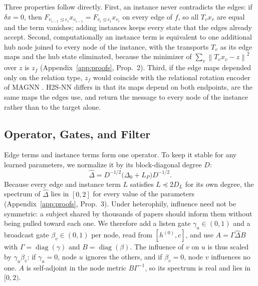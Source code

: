 \documentclass{article}
\newcommand{\method}{\textsc{H2S-NN}}
\newcommand{\norm}[1]{\left\lVert #1\right\rVert}
\newcommand{\inc}{\trianglelefteq}
\begin{document}
Three properties follow directly. First, an instance never contradicts the edges: if $\delta x=0$, then $F_{v_{i-1}\inc e_i}x_{v_{i-1}}=F_{v_i\inc e_i}x_{v_i}$ on every edge of $f$, so all $T_vx_v$ are equal and the term vanishes; adding instances keeps every state that the edges already accept. Second, computationally an instance term is equivalent to one additional hub node joined to every node of the instance, with the transports $T_v$ as its edge maps and the hub state eliminated, because the minimizer of $\sum_v\norm{T_vx_v-z}^2$ over $z$ is $z_f$ (Appendix~\ref{app:proofs}, Prop.~2). Third, if the edge maps depended only on the relation type, $z_f$ would coincide with the relational rotation encoder of MAGNN \cite{fu2020magnn}. \method{} differs in that its maps depend on both endpoints, are the same maps the edges use, and return the message to every node of the instance rather than to the target alone.

\subsection{Operator, Gates, and Filter}
Edge terms and instance terms form one operator. To keep it stable for any learned parameters, we normalize it by its block-diagonal degree $D$:
\begin{equation}
  \hat{\Delta}=D^{-1/2}\bigl(\Delta_0+L_P\bigr)D^{-1/2}.
  \label{eq:operator}
\end{equation}
Because every edge and instance term $L$ satisfies $L\preceq 2D_L$ for its own degree, the spectrum of $\hat{\Delta}$ lies in $[0,2]$ for every value of the parameters (Appendix~\ref{app:proofs}, Prop.~3). Under heterophily, influence need not be symmetric: a subject shared by thousands of papers should inform them without being pulled toward each one. We therefore add a listen gate $\gamma_u\in(0,1)$ and a broadcast gate $\beta_v\in(0,1)$ per node, read from $[h^{(0)},c]$, and use $A=\Gamma\hat{\Delta}B$ with $\Gamma=\operatorname{diag}(\gamma)$ and $B=\operatorname{diag}(\beta)$. The influence of $v$ on $u$ is thus scaled by $\gamma_u\beta_v$: if $\gamma_u=0$, node $u$ ignores the others, and if $\beta_v=0$, node $v$ influences no one. $A$ is self-adjoint in the node metric $B\Gamma^{-1}$, so its spectrum is real and lies in $[0,2)$.
\end{document}
